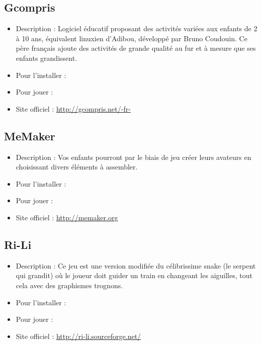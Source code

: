 \subsection{Gcompris}
\begin{itemize}
\begingroup
{}
\item Description : Logiciel éducatif proposant des activités variées aux enfants de 2 à 10 ans, équivalent linuxien d'Adibou, développé par Bruno Coudouin. Ce père français ajoute des activités de grande qualité au fur et à mesure que ses enfants grandissent.{\par}
\endgroup
\item Pour l'installer : 
\item Pour jouer : 
\item Site officiel : \url{http://gcompris.net/-fr-}{\par}
\end{itemize}
\subsection{MeMaker}
\begin{itemize}
\begingroup
{}
\item Description : Vos enfants pourront par le biais de jeu créer leurs avateurs en choisissant divers éléments à assembler.{\par}
\item Pour l'installer : 
\item Pour jouer : 
\item Site officiel : \url{http://memaker.org}{\par}
\endgroup
\end{itemize}
\subsection{Ri-Li}
\begin{itemize}
\begingroup
{}
\item Description : Ce jeu est une version modifiée du célibrissime snake (le serpent qui grandit) où le joueur doit guider un train en changeant les aiguilles, tout cela avec des graphismes trognons.{\par}
\item Pour l'installer : 
\item Pour jouer : 
\item Site officiel : \url{http://ri-li.sourceforge.net/}{\par}
\endgroup
\end{itemize}
\newpage
